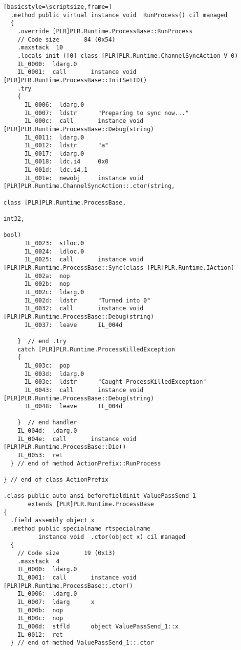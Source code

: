 \begin{lstlisting}[basicstyle=\scriptsize,frame=]
  .method public virtual instance void  RunProcess() cil managed
  {
    .override [PLR]PLR.Runtime.ProcessBase::RunProcess
    // Code size       84 (0x54)
    .maxstack  10
    .locals init ([0] class [PLR]PLR.Runtime.ChannelSyncAction V_0)
    IL_0000:  ldarg.0
    IL_0001:  call       instance void [PLR]PLR.Runtime.ProcessBase::InitSetID()
    .try
    {
      IL_0006:  ldarg.0
      IL_0007:  ldstr      "Preparing to sync now..."
      IL_000c:  call       instance void [PLR]PLR.Runtime.ProcessBase::Debug(string)
      IL_0011:  ldarg.0
      IL_0012:  ldstr      "a"
      IL_0017:  ldarg.0
      IL_0018:  ldc.i4     0x0
      IL_001d:  ldc.i4.1
      IL_001e:  newobj     instance void [PLR]PLR.Runtime.ChannelSyncAction::.ctor(string,
                                                                                   class [PLR]PLR.Runtime.ProcessBase,
                                                                                   int32,
                                                                                   bool)
      IL_0023:  stloc.0
      IL_0024:  ldloc.0
      IL_0025:  call       instance void [PLR]PLR.Runtime.ProcessBase::Sync(class [PLR]PLR.Runtime.IAction)
      IL_002a:  nop
      IL_002b:  nop
      IL_002c:  ldarg.0
      IL_002d:  ldstr      "Turned into 0"
      IL_0032:  call       instance void [PLR]PLR.Runtime.ProcessBase::Debug(string)
      IL_0037:  leave      IL_004d

    }  // end .try
    catch [PLR]PLR.Runtime.ProcessKilledException 
    {
      IL_003c:  pop
      IL_003d:  ldarg.0
      IL_003e:  ldstr      "Caught ProcessKilledException"
      IL_0043:  call       instance void [PLR]PLR.Runtime.ProcessBase::Debug(string)
      IL_0048:  leave      IL_004d

    }  // end handler
    IL_004d:  ldarg.0
    IL_004e:  call       instance void [PLR]PLR.Runtime.ProcessBase::Die()
    IL_0053:  ret
  } // end of method ActionPrefix::RunProcess

} // end of class ActionPrefix

.class public auto ansi beforefieldinit ValuePassSend_1
       extends [PLR]PLR.Runtime.ProcessBase
{
  .field assembly object x
  .method public specialname rtspecialname 
          instance void  .ctor(object x) cil managed
  {
    // Code size       19 (0x13)
    .maxstack  4
    IL_0000:  ldarg.0
    IL_0001:  call       instance void [PLR]PLR.Runtime.ProcessBase::.ctor()
    IL_0006:  ldarg.0
    IL_0007:  ldarg      x
    IL_000b:  nop
    IL_000c:  nop
    IL_000d:  stfld      object ValuePassSend_1::x
    IL_0012:  ret
  } // end of method ValuePassSend_1::.ctor


\end{lstlisting}
